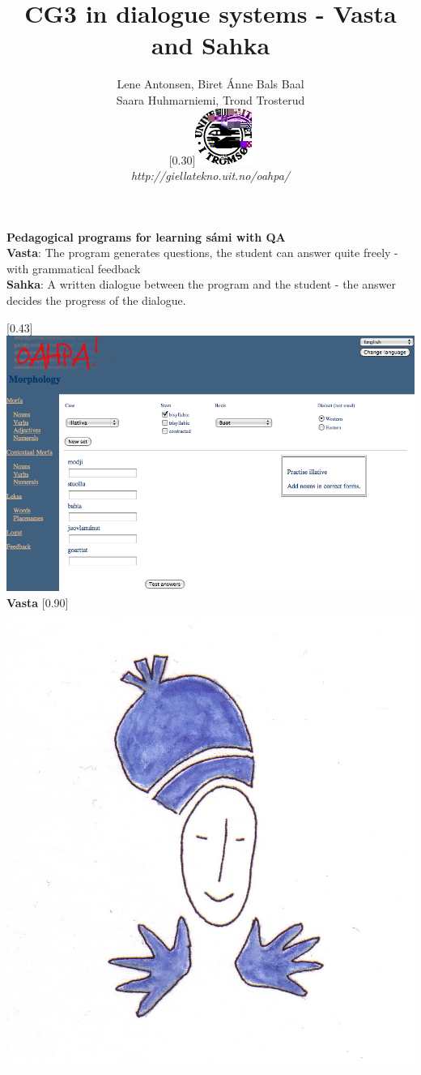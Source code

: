 \documentclass[landscape,norsk,11pt]{seminar}
\title{CG3 in dialogue systems - Vasta and Sahka}
\author{Lene Antonsen, Biret Ánne Bals Baal\\
Saara Huhmarniemi, Trond Trosterud \\
 \scalebox{0.30}[0.30]{\includegraphics{img/logoWeb070sh.jpg}} \\
  \textit{http://giellatekno.uit.no/oahpa/}}
\begin{document}
\begin{slide}

\maketitle

\newslide
\textbf{Pedagogical programs for learning sámi with QA}\\
\newline
\textbf{Vasta}: The program generates questions, the student can answer quite freely - with grammatical feedback \\ \newline
\textbf{Sahka}: A written dialogue between the program and the student - the answer decides the progress of the dialogue.


\newslide
\scalebox{0.45}[0.43]{\includegraphics{img/oahpa.png}} \\


\newslide
\textbf{Vasta}
\scalebox{0.90}[0.90]{\includegraphics{img/vasta.png}} \\


\end{slide}
\end{document}
